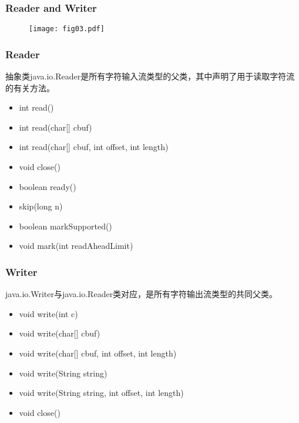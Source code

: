 \begin{frame}[fragile] %
\frametitle{Reader and Writer}

\begin{figure}
\centering
\texttt{[image: fig03.pdf]}
\end{figure}
\end{frame}

\begin{frame}[fragile] %
\frametitle{Reader}

抽象类java.io.Reader是所有字符输入流类型的父类，其中声明了用于读取字符流的有关方法。
\begin{itemize}
\item int read()
\item int read(char[] cbuf)
\item int read(char[] cbuf, int offset, int length)
\end{itemize}

\begin{itemize}
\item void close()
\item boolean ready()
\item skip(long n)
\item boolean markSupported()
\item void mark(int readAheadLimit)
\end{itemize}
\end{frame}

\begin{frame}[fragile] %
\frametitle{Writer}

java.io.Writer与java.io.Reader类对应，是所有字符输出流类型的共同父类。
\begin{itemize}
\item void write(int c)
\item void write(char[] cbuf)
\item void write(char[] cbuf, int offset, int length)
\item void write(String string)
\item void write(String string, int offset, int length)
\end{itemize}
\begin{itemize}
\item void close()
\end{itemize}
\end{frame}

